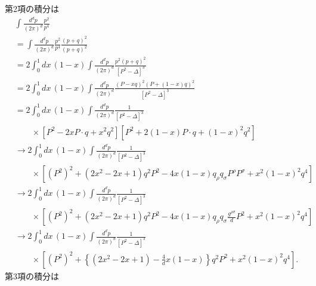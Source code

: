 第2項の積分は
\begin{align*}
  & \int \frac{d^dp}{(2\pi)^d} \frac{p^2}{p^4} \\
  &= \int \frac{d^dp}{(2\pi)^d} \frac{p^2}{p^4} \frac{(p+q)^2}{(p+q)^2} \\
  &= 2 \int_0^1 dx \, (1-x) \int \frac{d^dp}{(2\pi)^d} \frac{p^2 (p+q)^2}{[P^2-\Delta]^3} \\
  &= 2 \int_0^1 dx \, (1-x) \int \frac{d^dp}{(2\pi)^d} \frac{(P-xq)^2 (P+(1-x)q)^2}{[P^2-\Delta]^3} \\
  &= 2 \int_0^1 dx \, (1-x) \int \frac{d^dp}{(2\pi)^d} \frac{1}{[P^2-\Delta]^3} \\
  &\qquad\times \left[ P^2 - 2x P\cdot q + x^2 q^2 \right]
  \left[ P^2 + 2(1-x) P\cdot q + (1-x)^2 q^2 \right] \\
  &\to 2 \int_0^1 dx \, (1-x) \int \frac{d^dp}{(2\pi)^d} \frac{1}{[P^2-\Delta]^3} \\
  &\qquad\times \left[ (P^2)^2 + (2x^2-2x+1) q^2 P^2 - 4x(1-x) q_\rho q_\sigma P^\rho P^\sigma + x^2(1-x)^2 q^4 \right] \\
  &\to 2 \int_0^1 dx \, (1-x) \int \frac{d^dp}{(2\pi)^d} \frac{1}{[P^2-\Delta]^3} \\
  &\qquad\times \left[ (P^2)^2 + (2x^2-2x+1) q^2 P^2 - 4x(1-x) q_\rho q_\sigma \frac{g^{\rho\sigma}}{d} P^2 + x^2(1-x)^2 q^4 \right] \\
  &\to 2 \int_0^1 dx \, (1-x) \int \frac{d^dp}{(2\pi)^d} \frac{1}{[P^2-\Delta]^3} \\
  &\qquad\times \left[ (P^2)^2 + \left\{ (2x^2-2x+1) - \frac{4}{d} x(1-x) \right\} q^2 P^2 + x^2(1-x)^2 q^4 \right] .
\end{align*}
第3項の積分は
